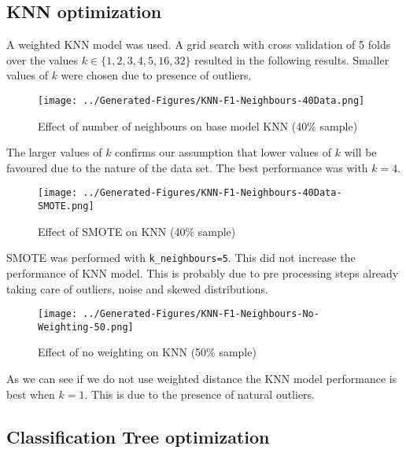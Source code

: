 \documentclass[conference]{IEEEtran}
\begin{document}
\subsection{KNN optimization}
A weighted KNN model was used. A grid search with cross validation of 5 folds over the values $k \in \{1, 2, 3, 4, 5, 16, 32\}$ resulted in the following results. Smaller values of $k$ were chosen due to presence of outliers. 
\begin{figure}[H]
	\centering
	\begin{minipage}{0.45\textwidth}
		\centering
		\texttt{[image: ../Generated-Figures/KNN-F1-Neighbours-40Data.png]}
		\caption{Effect of number of neighbours on base model KNN (40\% sample)}
		\label{fig:neighbours}
	\end{minipage}
\end{figure}

The larger values of $k$ confirms our assumption that lower values of $k$ will be favoured due to the nature of the data set. The best performance was with $k=4$.

\begin{figure}[H]
	\centering
	\begin{minipage}{0.45\textwidth}
		\centering
		\texttt{[image: ../Generated-Figures/KNN-F1-Neighbours-40Data-SMOTE.png]}
		\caption{Effect of SMOTE on KNN (40\% sample)}
		\label{fig:smote}
	\end{minipage}
\end{figure}

SMOTE was performed with \texttt{k\_neighbours=5}. This did not increase the performance of KNN model. This is probably due to pre processing steps already taking care of outliers, noise and skewed distributions.

\begin{figure}[H]
	\centering
	\begin{minipage}{0.45\textwidth}
		\centering
		\texttt{[image: ../Generated-Figures/KNN-F1-Neighbours-No-Weighting-50.png]}
		\caption{Effect of no weighting on KNN (50\% sample)}
		\label{fig:smote}
	\end{minipage}
\end{figure}

As we can see if we do not use weighted distance the KNN model performance is best when $k=1$. This is due to the presence of natural outliers. 

\subsection{Classification Tree optimization}
\end{document}
